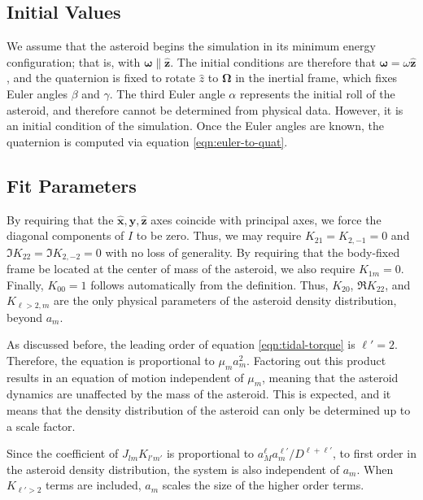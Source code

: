 \documentclass[11pt]{article}
\newcommand{\unit}[1]{\hat{\mathbf{#1}}}
\begin{document}
\subsection{Initial Values}
We assume that the asteroid begins the simulation in its minimum energy configuration; that is, with $\bm \omega \parallel \unit z$. The initial conditions are therefore that $\bm \omega = \omega \unit z$, and the quaternion is fixed to rotate $\hat z$ to $\bm \Omega$ in the inertial frame, which fixes Euler angles $\beta$ and $\gamma$. The third Euler angle $\alpha$ represents the initial roll of the asteroid, and therefore cannot be determined from physical data. However, it is an initial condition of the simulation. Once the Euler angles are known, the quaternion is computed via equation \ref{eqn:euler-to-quat}.


\subsection{Fit Parameters}
By requiring that the $\unit x, \unit y, \unit z$ axes coincide with principal axes, we force the diagonal components of $I$ to be zero. Thus, we may require $K_{21}=K_{2,-1}=0$ and $\Im K_{22}=\Im K_{2,-2}=0$ with no loss of generality. By requiring that the body-fixed frame be located at the center of mass of the asteroid, we also require $K_{1m}=0$. Finally, $K_{00}=1$ follows automatically from the definition. Thus, $K_{20}$, $\Re K_{22}$, and $K_{\ell>2, m}$ are the only physical parameters of the asteroid density distribution, beyond $a_m$.

As discussed before, the leading order of equation \ref{eqn:tidal-torque} is $\ell' = 2$. Therefore, the equation is proportional to $\mu_m a_m^2$. Factoring out this product results in an equation of motion independent of $\mu_m$, meaning that the asteroid dynamics are unaffected by the mass of the asteroid. This is expected, and it means that the density distribution of the asteroid can only be determined up to a scale factor.

Since the coefficient of $J_{lm}K_{l'm'}$ is proportional to $a_M^\ell a_m^{\ell'} / D^{\ell+\ell'}$, to first order in the asteroid density distribution, the system is also independent of $a_m$. When $K_{\ell' > 2}$ terms are included, $a_m$ scales the size of the higher order terms.
\end{document}
